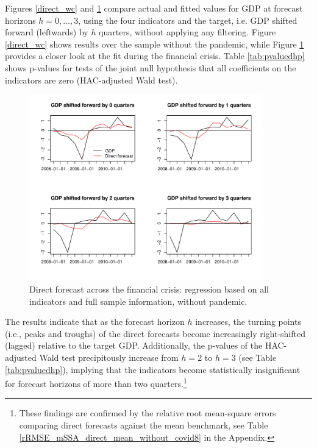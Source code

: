 \documentclass[11pt,a4paper]{article}
\begin{document}
Figures \ref{direct_wc} and \ref{direct_wc_financial_crisis} compare actual and fitted values for GDP at forecast horizons $h = 0, \ldots, 3$, using the four indicators and the target, i.e. GDP shifted forward (leftwards) by $h$ quarters, without applying any filtering. Figure \ref{direct_wc} shows results over the sample without the pandemic, while Figure \ref{direct_wc_financial_crisis} provides a closer look at the fit during the financial crisis. Table \ref{tab:pvaluedhp} shows p-values for tests of the joint null hypothesis that all coefficients on the indicators are zero (HAC-adjusted Wald test).

\begin{figure}[H]
    \begin{center}
        \includegraphics[width=0.9\textwidth]{./Figures/direct_wc_financial_crisis.pdf}
        \caption{Direct forecast across the financial crisis:  regression based on all indicators and full sample information, without pandemic.
        \label{direct_wc_financial_crisis}}
    \end{center}
\end{figure}

The results indicate that as the forecast horizon $h$ increases, the turning points (i.e., peaks and troughs) of the direct forecasts become increasingly right-shifted (lagged) relative to the target GDP. Additionally, the p-values of the HAC-adjusted Wald test precipitously increase from $h=2$ to $h=3$ (see Table \ref{tab:pvaluedhp}), implying that the indicators become statistically insignificant for forecast horizons of more than two quarters.\footnote{ 
These findings are confirmed by the relative root mean-square errors comparing direct forecasts against the mean benchmark, see Table \ref{rRMSE_mSSA_direct_mean_without_covid8} in the Appendix.} 
\end{document}
